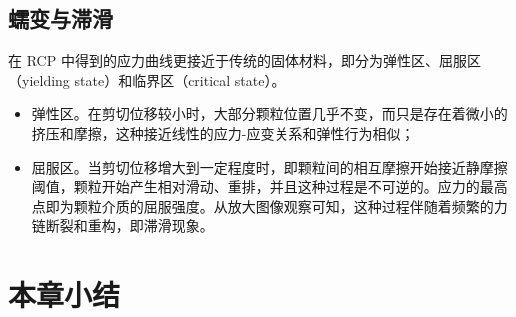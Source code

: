\subsection{蠕变与滞滑}

在 RCP 中得到的应力曲线更接近于传统的固体材料，即分为弹性区、屈服区（yielding state）和临界区（critical state）。

\begin{itemize}
  \item 弹性区。在剪切位移较小时，大部分颗粒位置几乎不变，而只是存在着微小的挤压和摩擦，这种接近线性的应力-应变关系和弹性行为相似；
  \item 屈服区。当剪切位移增大到一定程度时，即颗粒间的相互摩擦开始接近静摩擦阈值，颗粒开始产生相对滑动、重排，并且这种过程是不可逆的。应力的最高点即为颗粒介质的屈服强度。从放大图像观察可知，这种过程伴随着频繁的力链断裂和重构，即滞滑现象。
\end{itemize}

\section{本章小结}